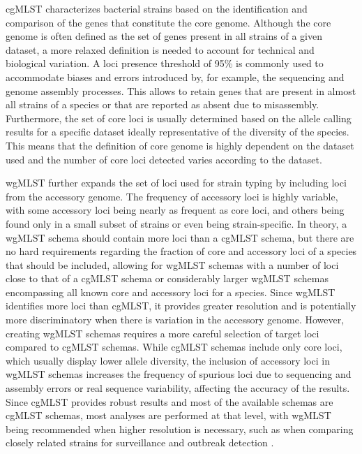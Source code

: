 \ac{cgMLST} characterizes bacterial strains based on the identification and comparison of the genes that constitute the core genome. Although the core genome is often defined as the set of genes present in all strains of a given dataset, a more relaxed definition is needed to account for technical and biological variation. A loci presence threshold of 95\% is commonly used to accommodate biases and errors introduced by, for example, the sequencing and genome assembly processes. This allows to retain genes that are present in almost all strains of a species or that are reported as absent due to misassembly. Furthermore, the set of core loci is usually determined based on the allele calling results for a specific dataset ideally representative of the diversity of the species. This means that the definition of core genome is highly dependent on the dataset used and the number of core loci detected varies according to the dataset.

\ac{wgMLST} further expands the set of loci used for strain typing by including loci from the accessory genome. The frequency of accessory loci is highly variable, with some accessory loci being nearly as frequent as core loci, and others being found only in a small subset of strains or even being strain-specific. In theory, a \ac{wgMLST} schema should contain more loci than a \ac{cgMLST} schema, but there are no hard requirements regarding the fraction of core and accessory loci of a species that should be included, allowing for \ac{wgMLST} schemas with a number of loci close to that of a \ac{cgMLST} schema or considerably larger \ac{wgMLST} schemas encompassing all known core and accessory loci for a species. Since \ac{wgMLST} identifies more loci than \ac{cgMLST}, it provides greater resolution and is potentially more discriminatory when there is variation in the accessory genome. However, creating \ac{wgMLST} schemas requires a more careful selection of target loci compared to \ac{cgMLST} schemas. While \ac{cgMLST} schemas include only core loci, which usually display lower allele diversity, the inclusion of accessory loci in \ac{wgMLST} schemas increases the frequency of spurious loci due to sequencing and assembly errors or real sequence variability, affecting the accuracy of the results. Since \ac{cgMLST} provides robust results and most of the available schemas are \ac{cgMLST} schemas, most analyses are performed at that level, with \ac{wgMLST} being recommended when higher resolution is necessary, such as when comparing closely related strains for surveillance and outbreak detection \cite{mixao_multi-country_2025, joseph_evaluation_2023, leeper_evaluation_2023, leeper_validation_2025}.

